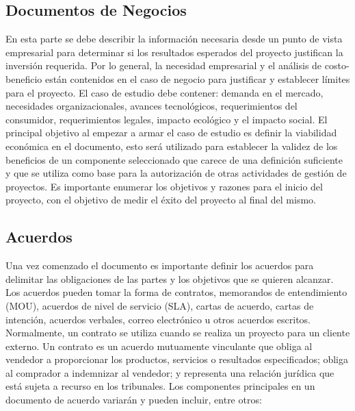 \documentclass[letterpaper,12pt,openright,oneside]{article}
\theoremstyle{plain}
\begin{document}
\subsection*{Documentos de Negocios}

En esta parte se debe describir la información necesaria desde un punto de vista empresarial para determinar si los resultados esperados del proyecto justifican la inversión requerida. Por lo general, la necesidad empresarial y el análisis de costo-beneficio están contenidos en el caso de negocio para justificar y establecer límites para el proyecto. El caso de estudio debe contener: demanda en el mercado, necesidades organizacionales, avances tecnológicos, requerimientos del consumidor, requerimientos legales, impacto ecológico y el impacto social. 
El principal objetivo al empezar a armar el caso de estudio es definir la viabilidad económica en el documento, esto será utilizado para establecer la validez de los beneficios de un componente seleccionado que carece de una definición suficiente y que se utiliza como base para la autorización de otras actividades de gestión de proyectos. Es importante enumerar los objetivos y razones para el inicio del proyecto, con el objetivo de medir el éxito del proyecto al final del mismo.

% 
% 
\subsection*{Acuerdos}

Una vez comenzado el documento es importante definir los acuerdos para delimitar las obligaciones de las partes y los objetivos que se quieren alcanzar.
Los acuerdos pueden tomar la forma de contratos, memorandos de entendimiento (MOU), acuerdos de nivel de servicio (SLA), cartas de acuerdo, cartas de intención, acuerdos verbales, correo electrónico u otros acuerdos escritos. Normalmente, un contrato se utiliza cuando se realiza un proyecto para un cliente externo.
Un contrato es un acuerdo mutuamente vinculante que obliga al vendedor a proporcionar los productos, servicios o resultados especificados; obliga al comprador a indemnizar al vendedor; y representa una relación jurídica que está sujeta a recurso en los tribunales. Los componentes principales en un documento de acuerdo variarán y pueden incluir, entre otros: 
\end{document}
